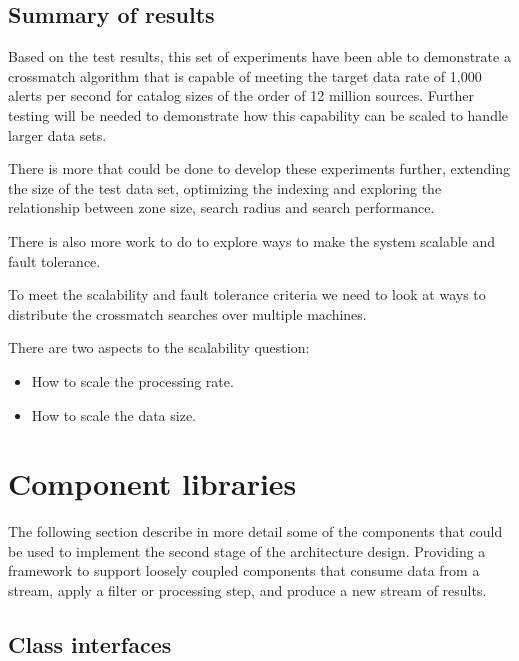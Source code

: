 \documentclass{article}
\newcommand{\crossmatch} {crossmatch\xspace}
\begin{document}
\subsection{Summary of results}
\label{crossmatch-summary}

Based on the test results, this set of experiments have been able to demonstrate a \crossmatch algorithm that is capable of meeting the target data rate of 1,000 alerts per second for catalog sizes of the order of 12 million sources. Further testing will be needed to demonstrate how this capability can be scaled to handle larger data sets.

There is more  that could be done to develop these experiments further, extending the size of the test data set, optimizing the indexing and exploring the relationship between zone size, search radius and search performance.

There is also more work to do to explore ways to make the system scalable and fault tolerance.

To meet the scalability and fault tolerance criteria we need to look at ways to distribute the \crossmatch searches over multiple machines.

There are two aspects to the scalability question:
\begin{itemize}
    \item How to scale the processing rate.
    \item How to scale the data size.
\end{itemize}{}















\section{Component libraries}
\label{component-libraries}

The following section describe in more detail some of the components that could be used to implement the second stage of the architecture design. Providing a framework to support loosely coupled components that consume data from a stream, apply a filter or processing step, and produce a new stream of results.

\subsection{Class interfaces}
\label{component-libraries.java-interfaces}
\end{document}
